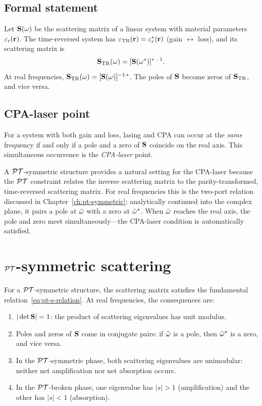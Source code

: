 \subsection{Formal statement}
\label{ssec:tr-formal}

Let $\mathbf{S}(\omega)$ be the scattering matrix of a linear system with
material parameters $\varepsilon_{\mathrm{r}}(\mathbf{r})$. The time-reversed system has
$\varepsilon_{\mathrm{TR}}(\mathbf{r}) = \varepsilon_{\mathrm{r}}^*(\mathbf{r})$ (gain $\leftrightarrow$ loss),
and its scattering matrix is
\begin{equation}
 \mathbf{S}_{\mathrm{TR}}(\omega) = [\mathbf{S}(\omega^*)]^{*\,-1}.
 \label{eq:s-time-reversed}
\end{equation}
At real frequencies, $\mathbf{S}_{\mathrm{TR}}(\omega) = [\mathbf{S}(\omega)]^{-1\,*}$.
The poles of $\mathbf{S}$ become zeros of $\mathbf{S}_{\mathrm{TR}}$, and vice versa.

\subsection{CPA-laser point}
\label{ssec:cpa-laser}

For a system with both gain and loss, lasing and CPA can occur at the
\emph{same} frequency if and only if a pole and a zero of $\mathbf{S}$
coincide on the real axis. This simultaneous occurrence is the
\emph{CPA-laser} point.

A $\mathcal{PT}$-symmetric structure provides a natural setting for the CPA-laser
because the $\mathcal{PT}$ constraint relates the inverse scattering matrix to
the parity-transformed, time-reversed scattering matrix. For real
frequencies this is the two-port relation discussed in
Chapter~\ref{ch:pt-symmetric}; analytically continued into the complex
plane, it pairs a pole at $\tilde{\omega}$ with a zero at $\tilde{\omega}^*$.
When $\tilde{\omega}$ reaches the real axis, the pole and zero meet
simultaneously---the CPA-laser condition is automatically satisfied.

\section{$\mathcal{PT}$-symmetric scattering}
\label{sec:pt-scattering}

For a $\mathcal{PT}$-symmetric structure, the scattering matrix satisfies the
fundamental relation~\eqref{eq:pt-s-relation}. At real frequencies, the
consequences are:
\begin{enumerate}
 \item $|\det\mathbf{S}| = 1$: the product of scattering eigenvalues has
 unit modulus.
 \item Poles and zeros of $\mathbf{S}$ come in conjugate pairs:
 if $\tilde{\omega}$ is a pole, then $\tilde{\omega}^*$ is a zero, and vice versa.
 \item In the $\mathcal{PT}$-symmetric phase, both scattering eigenvalues are
 unimodular: neither net amplification nor net absorption occurs.
 \item In the $\mathcal{PT}$-broken phase, one eigenvalue has $|s| > 1$
 (amplification) and the other has $|s| < 1$ (absorption).
\end{enumerate}

